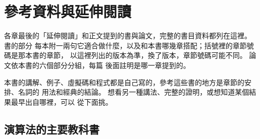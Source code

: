 \chapter*{參考資料與延伸閱讀}
\label{ch:references}

各章最後的「延伸閱讀」和正文提到的書與論文，完整的書目資料都列在這裡。 書的部分
每本附一兩句它適合做什麼，以及和本書哪幾章搭配；括號裡的章節號碼是那本書的章節，
以這裡列出的版本為準，換了版本，章節號碼可能不同。 論文依本書的六個部分分組，每篇
後面註明是哪一章提到的。

本書的講解、例子、虛擬碼和程式都是自己寫的，參考這些書的地方是章節的安排、名詞的
用法和經典的結論。 想看另一種講法、完整的證明，或想知道某個結果最早出自哪裡，可以
從下面挑。

\section*{演算法的主要教科書}

